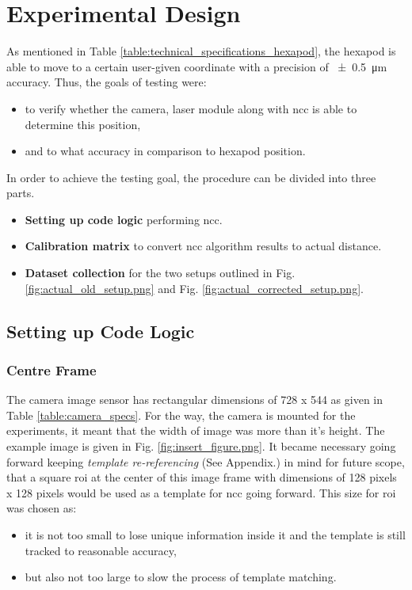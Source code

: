\chapter{Experimental Design}

As mentioned in Table \ref{table:technical_specifications_hexapod}, the hexapod is able to move to a certain user-given coordinate with a precision of \SI{\pm0.5}{\micro\meter} accuracy. Thus, the goals of testing were:
\begin{itemize}
    \item to verify whether the camera, laser module along with \gls{ncc} is able to determine this position,
    \item and to what accuracy in comparison to hexapod position.     
\end{itemize}

\vspace{5mm}

\noindent In order to achieve the testing goal, the procedure can be divided into three parts.

\begin{itemize}
    \item \textbf{Setting up code logic} performing \gls{ncc}.
    \item \textbf{Calibration matrix} to convert \gls{ncc} algorithm results to actual distance.
    \item \textbf{Dataset collection} for the two setups outlined in Fig. \ref{fig:actual_old_setup.png} and Fig. \ref{fig:actual_corrected_setup.png}.
\end{itemize}


\section{Setting up Code Logic}
    \subsection*{Centre Frame}
        The camera image sensor has rectangular dimensions of 728 x 544 as given in Table \ref{table:camera_specs}. For the way, the camera is mounted for the experiments, it meant that the width of image was more than it's height. The example image is given in Fig. \ref{fig:insert_figure.png}. It became necessary going forward keeping \emph{template re-referencing} (See Appendix.) in mind for future scope, that a square \gls{roi} at the center of this image frame with dimensions of 128 pixels x 128 pixels would be used as a template for \gls{ncc} going forward. This size for \gls{roi} was chosen as:
        \begin{itemize}
            \item it is not too small to lose unique information inside it and the template is still tracked to reasonable accuracy,
            \item but also not too large to slow the process of template matching.
        \end{itemize}            

